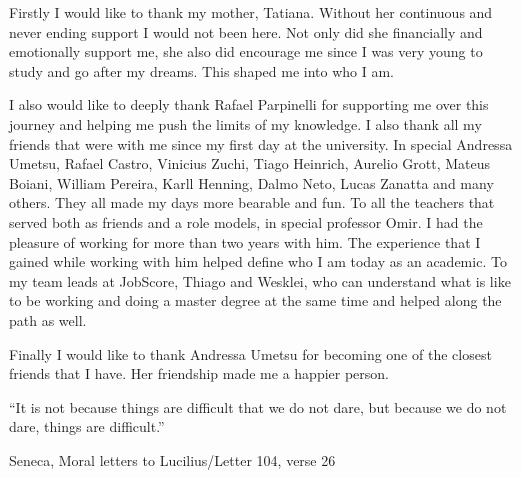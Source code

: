 \begin{agradecimentos}
  Firstly I would like to thank my mother, Tatiana. Without her continuous and never ending support
  I would not been here. Not only did she financially and emotionally support me, she also
  did encourage me since I was very young to study and go after my dreams. This shaped me
  into who I am.

  I also would like to deeply thank Rafael Parpinelli for supporting me over this journey
  and helping me push the limits of my knowledge. I also thank all my friends that were with
  me since my first day at the university. In special Andressa Umetsu, Rafael Castro, Vinicius Zuchi,
  Tiago Heinrich,
  Aurelio Grott, Mateus Boiani, William Pereira, Karll Henning, Dalmo Neto, Lucas Zanatta and many others.
  They all made my days more bearable and fun.
  To all the teachers that served both as friends and a role models,
  in special professor Omir. I had the pleasure of working for more than two years with him.
  The experience that I gained while working with him helped define who I am today as an academic.
  To my team leads at JobScore, Thiago and Wesklei,
  who can understand what is like to be working and doing a master
  degree at the same time and helped along the path as well.

  Finally I would like to thank Andressa Umetsu for becoming one of the closest friends that
  I have. Her friendship made me a happier person.
\end{agradecimentos}


\begin{epigrafe}
  ``It is not because things are difficult that we do not dare, but because we do not dare, things are difficult.''
  \\
  \par
  Seneca, Moral letters to Lucilius/Letter 104, verse 26
\end{epigrafe}




\newpage\null\thispagestyle{empty}\newpage

